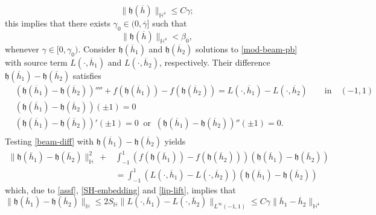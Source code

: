 \documentclass[11pt,a4paper]{amsart}
\theoremstyle{remark}
\theoremstyle{definition}
\numberwithin{equation}{section}
\numberwithin{proposition}{section}
\begin{document}
\begin{equation*}
    \|\mathfrak{h}(\overline{h})\|_{\mathbb{H}^4}
    \leq C\gamma;
\end{equation*}this implies that there exists $\gamma_0\in (0, \overline{\gamma}]$ such that
\begin{equation}\label{bound-map}
    \| \mathfrak{h}(\overline{h}) \|_{\mathbb{H}^4} < \beta_0,
\end{equation}whenever $\gamma\in [0, \gamma_0)$.
 Consider $\mathfrak{h}(\overline{h}_1)$ and $\mathfrak{h}(\overline{h}_2)$ solutions to \eqref{mod-beam-pb} with source term $L(\cdot, \overline{h}_1)$ and $L(\cdot, \overline{h}_2)$, respectively. Their difference $\mathfrak{h}(\overline{h}_1)-\mathfrak{h}(\overline{h}_2)$ satisfies
\begin{equation}\label{beam-diff}\begin{aligned}
    &\left(\mathfrak{h}(\overline{h}_1) - \mathfrak{h}(\overline{h}_2)\right)'''' + f(\mathfrak{h}(\overline{h}_1)) - f(\mathfrak{h}(\overline{h}_2)) = L(\cdot, \overline{h}_1) - L(\cdot, \overline{h}_2) \qquad \text{in} \quad (-1,1)\\[2pt]
    &\left(\mathfrak{h}(\overline{h}_1) - \mathfrak{h}(\overline{h}_2)\right)(\pm 1) = 0 \\[2pt]&\left(\mathfrak{h}(\overline{h}_1) - \mathfrak{h}(\overline{h}_2)\right)'(\pm 1)=0 \ \text{ or } \  \left(\mathfrak{h}(\overline{h}_1) - \mathfrak{h}(\overline{h}_2)\right)''(\pm 1)=0.\\[5pt]
		\end{aligned}
\end{equation}
 Testing \eqref{beam-diff} with $\mathfrak{h}(\overline{h}_1)-\mathfrak{h}(\overline{h}_2)$ yields
 \begin{equation*}\begin{aligned}
     \|\mathfrak{h}(\overline{h}_1)-\mathfrak{h}(\overline{h}_2) \|^2_{\mathbb{H}} \ + &\int_{-1}^1 \left(f(\mathfrak{h}(\overline{h}_1))-f(\mathfrak{h}(\overline{h}_2))\right) (\mathfrak{h}(\overline{h}_1)-\mathfrak{h}(\overline{h}_2))\\[5pt]&= \int_{-1}^{1}\left(L(\cdot, \overline{h}_1)-L(\cdot, \overline{h}_2)\right)(\mathfrak{h}(\overline{h}_1)-\mathfrak{h}(\overline{h}_2))
     \end{aligned}
 \end{equation*}
which, due to \eqref{assf}, \eqref{SH-embedding} and  \eqref{lip-lift}, implies that
\begin{equation}\label{conv-Hbb}
 \|\mathfrak{h}(\overline{h}_1)-\mathfrak{h}(\overline{h}_2) \|_{\mathbb{H}} \leq 2S_{\mathbb{H}}\|L(\cdot, \overline{h}_1)-L(\cdot, \overline{h}_2)\|_{L^\infty(-1,1)}\leq C \gamma \|\overline{h}_1 - \overline{h}_2\|_{\mathbb{H}^4}
\end{equation}
\end{document}
